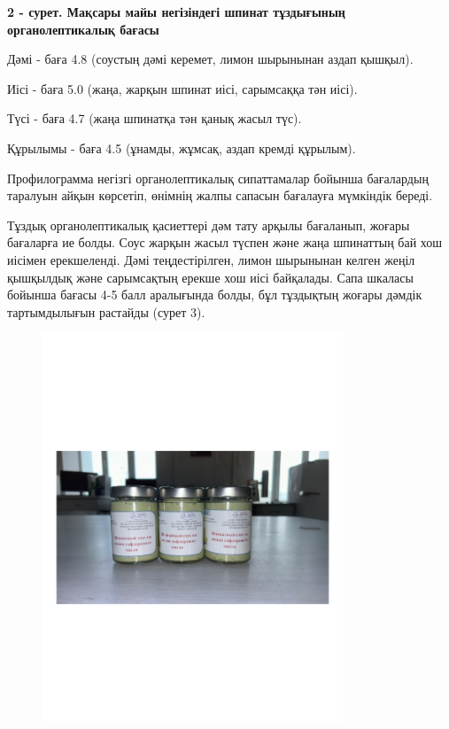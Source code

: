 {{\bfseries 2 - сурет. Мақсары майы негізіндегі шпинат тұздығының
органолептикалық бағасы}

Дәмі - баға 4.8 (соустың дәмі керемет, лимон шырынынан аздап қышқыл).

Иісі - баға 5.0 (жаңа, жарқын шпинат иісі, сарымсаққа тән иісі).

Түсі - баға 4.7 (жаңа шпинатқа тән қанық жасыл түс).

Құрылымы - баға 4.5 (ұнамды, жұмсақ, аздап кремді құрылым).

Профилограмма негізгі органолептикалық сипаттамалар бойынша бағалардың
таралуын айқын көрсетіп, өнімнің жалпы сапасын бағалауға мүмкіндік
береді.

Тұздық органолептикалық қасиеттері дәм тату арқылы бағаланып, жоғары
бағаларға ие болды. Соус жарқын жасыл түспен және жаңа шпинаттың бай хош
иісімен ерекшеленді. Дәмі теңдестірілген, лимон шырынынан келген жеңіл
қышқылдық және сарымсақтың ерекше хош иісі байқалады. Сапа шкаласы
бойынша бағасы 4-5 балл аралығында болды, бұл тұздықтың жоғары дәмдік
тартымдылығын растайды (сурет 3).

\begin{figure}[H]
	\centering
	\includegraphics[width=0.8\textwidth]{media/pish3/image3}
	\caption*{}
\end{figure}


}
